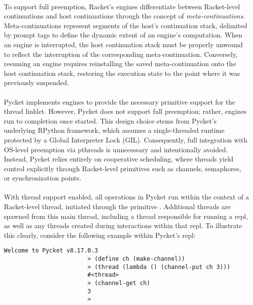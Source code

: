 				\paragraph{}%
					To support full preemption, Racket's engines differentiate between Racket-level continuations and host continuations through the concept of \emph{meta-continuations}. Meta-continuations represent segments of the host's continuation stack, delimited by prompt tags to define the dynamic extent of an engine's computation. When an engine is interrupted, the host continuation stack must be properly unwound to reflect the interruption of the corresponding meta-continuation. Conversely, resuming an engine requires reinstalling the saved meta-continuation onto the host continuation stack, restoring the execution state to the point where it was previously suspended.

				\paragraph{}%
					Pycket implements engines to provide the necessary primitive support for the thread linklet. However, Pycket does not support full preemption; rather, engines run to completion once started. This design choice stems from Pycket's underlying RPython framework, which assumes a single-threaded runtime protected by a Global Interpreter Lock (GIL). Consequently, full integration with OS-level preemption via pthreads is unnecessary and intentionally avoided. Instead, Pycket relies entirely on cooperative scheduling, where threads yield control explicitly through Racket-level primitives such as channels, semaphores, or synchronization points.

				\paragraph{}%
					With thread support enabled, all operations in Pycket run within the context of a Racket-level thread, initiated through the primitive . Additional threads are spawned from this main thread, including a thread responsible for running a \gls{repl}, as well as any threads created during interactions within that \gls{repl}. To illustrate this clearly, consider the following example within Pycket's \gls{repl}:

				\begin{center}
					\begin{minipage}{0.6\textwidth}
						\begin{lstlisting}[style=bashstyle,frame=lines,numbers=none]
						Welcome to Pycket v8.17.0.3
						> (define ch (make-channel))
						> (thread (lambda () (channel-put ch 3)))
						#<thread>
						> (channel-get ch)
						3
						>\end{lstlisting}
					\end{minipage}
				\end{center}

